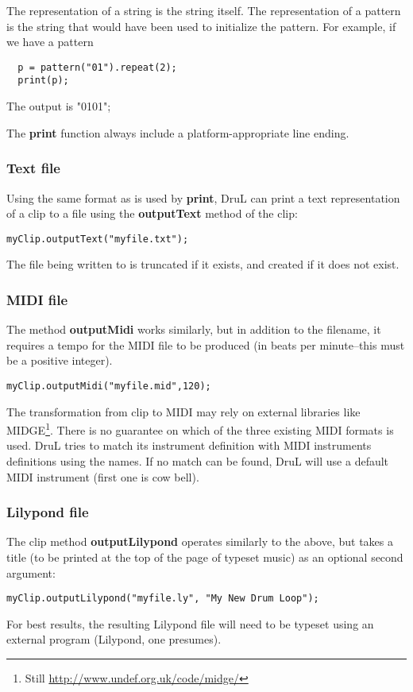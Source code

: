 The representation of a string is the string itself. The representation
of a pattern is the string that would have been used to initialize
the pattern. For example, if we have a pattern
\begin{verbatim}
  p = pattern("01").repeat(2);
  print(p);
\end{verbatim}
The output is "0101";

The \textbf{print} function always include a platform-appropriate line
ending.

\subsubsection{Text file}

Using the same format as is used by \textbf{print}, DruL can print a text representation of a clip to a file
using the \textbf{outputText} method of the clip:

\begin{verbatim}
myClip.outputText("myfile.txt");
\end{verbatim}

The file being written to is truncated if it exists, and created if it does not exist.

\subsubsection{MIDI file}

The method \textbf{outputMidi} works similarly, but in addition to the filename, it requires a tempo for the MIDI file to be produced (in beats per minute--this must be a positive integer).

\begin{verbatim}
myClip.outputMidi("myfile.mid",120);
\end{verbatim}

The transformation from clip to MIDI may rely
on external libraries like MIDGE\footnote{Still \url{http://www.undef.org.uk/code/midge/}}. There is no guarantee on which of the three existing MIDI formats is used.
DruL tries to match its instrument definition with MIDI instruments definitions
using the names. If no match can be found, DruL will use a default MIDI instrument (first one is cow bell).

\subsubsection{Lilypond file}

The clip method \textbf{outputLilypond} operates similarly to the above, but takes a title (to be printed at the top of the page of typeset music) as an optional second argument:

\begin{verbatim}
myClip.outputLilypond("myfile.ly", "My New Drum Loop");
\end{verbatim}


For best results, the resulting Lilypond file will need to be typeset using an external program (Lilypond, one presumes).

\clearpage
